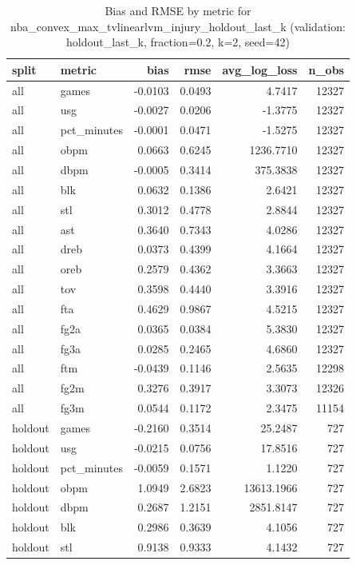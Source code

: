 \begin{table}
\caption{Bias and RMSE by metric for nba_convex_max_tvlinearlvm_injury_holdout_last_k (validation: holdout_last_k, fraction=0.2, k=2, seed=42)}
\label{tab:nba_convex_max_tvlinearlvm_injury_holdout_last_k_vs_holdout_last_k_f20_k2_s42_bias_rmse}
\begin{tabular}{llrrrr}
\toprule
split & metric & bias & rmse & avg\_log\_loss & n\_obs \\
\midrule
all & games & -0.0103 & 0.0493 & 4.7417 & 12327 \\
all & usg & -0.0027 & 0.0206 & -1.3775 & 12327 \\
all & pct\_minutes & -0.0001 & 0.0471 & -1.5275 & 12327 \\
all & obpm & 0.0663 & 0.6245 & 1236.7710 & 12327 \\
all & dbpm & -0.0005 & 0.3414 & 375.3838 & 12327 \\
all & blk & 0.0632 & 0.1386 & 2.6421 & 12327 \\
all & stl & 0.3012 & 0.4778 & 2.8844 & 12327 \\
all & ast & 0.3640 & 0.7343 & 4.0286 & 12327 \\
all & dreb & 0.0373 & 0.4399 & 4.1664 & 12327 \\
all & oreb & 0.2579 & 0.4362 & 3.3663 & 12327 \\
all & tov & 0.3598 & 0.4440 & 3.3916 & 12327 \\
all & fta & 0.4629 & 0.9867 & 4.5215 & 12327 \\
all & fg2a & 0.0365 & 0.0384 & 5.3830 & 12327 \\
all & fg3a & 0.0285 & 0.2465 & 4.6860 & 12327 \\
all & ftm & -0.0439 & 0.1146 & 2.5635 & 12298 \\
all & fg2m & 0.3276 & 0.3917 & 3.3073 & 12326 \\
all & fg3m & 0.0544 & 0.1172 & 2.3475 & 11154 \\
holdout & games & -0.2160 & 0.3514 & 25.2487 & 727 \\
holdout & usg & -0.0215 & 0.0756 & 17.8516 & 727 \\
holdout & pct\_minutes & -0.0059 & 0.1571 & 1.1220 & 727 \\
holdout & obpm & 1.0949 & 2.6823 & 13613.1966 & 727 \\
holdout & dbpm & 0.2687 & 1.2151 & 2851.8147 & 727 \\
holdout & blk & 0.2986 & 0.3639 & 4.1056 & 727 \\
holdout & stl & 0.9138 & 0.9333 & 4.1432 & 727 \\

\end{tabular}
\end{table}
